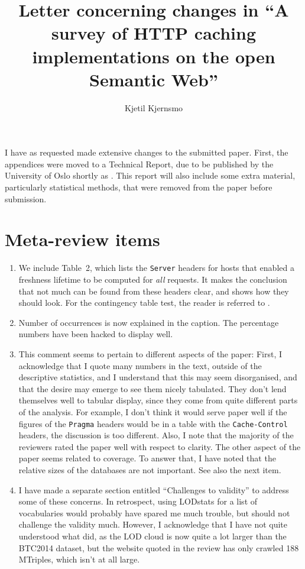\documentclass{article}
\title{Letter concerning changes in ``A survey of HTTP caching implementations on the open Semantic Web''}
\author{Kjetil Kjernsmo}
\newcommand{\httph}[1]{\texttt{#1}}
\begin{document}
\maketitle

I have as requested made extensive changes to the submitted
paper. First, the appendices were moved to a Technical Report, due to
be published by the University of Oslo shortly as
\cite{kjernsmo_add_survey_2015}. This report will also include some
extra material, particularly statistical methods, that were removed
from the paper before submission.

\section{Meta-review items}

\begin{enumerate}

\item We include Table~2, which lists the \httph{Server} headers for
  hosts that enabled a freshness lifetime to be computed for
  \emph{all} requests. It makes the conclusion that not much can be
  found from these headers clear, and shows how they should look. For
  the contingency table test, the reader is referred to
  \cite{kjernsmo_add_survey_2015}.

\item Number of occurrences is now explained in the caption. The
  percentage numbers have been hacked to display well.

\item This comment seems to pertain to different aspects of the paper:
  First, I acknowledge that I quote many numbers in the text, outside
  of the descriptive statistics, and I understand that this may seem
  disorganised, and that the desire may emerge to see them nicely
  tabulated. They don't lend themselves well to tabular display, since
  they come from quite different parts of the analysis. For example, I
  don't think it would serve paper well if the figures of the
  \httph{Pragma} headers would be in a table with the
  \httph{Cache-Control} headers, the discussion is too
  different. Also, I note that the majority of the reviewers rated the
  paper well with respect to clarity. The other aspect of the paper
  seems related to coverage. To answer that, I have noted that the
  relative sizes of the databases are not important. See also the next
  item.

\item I have made a separate section entitled ``Challenges to
  validity'' to address some of these concerns. In retrospect, using
  LODstats for a list of vocabularies would probably have spared me
  much trouble, but should not challenge the validity much. However, I
  acknowledge that I have not quite understood what
  \cite{stateoflod2014} did, as the LOD cloud is now quite a lot
  larger than the BTC2014 dataset, but the website quoted in the
  review has only crawled 188 MTriples, which isn't at all large.


\end{enumerate}
\end{document}
